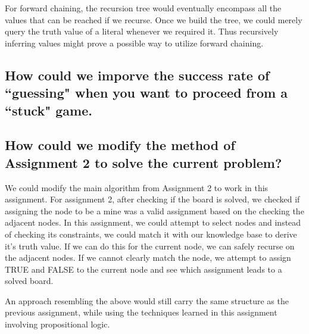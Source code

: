\documentclass{article}
\begin{document}
		For forward chaining, the recursion tree would eventually encompass all the 
		values that can be reached if we recurse. Once we build the tree, we could 
		merely query the truth value of a literal whenever we required it. Thus 
		recursively inferring values might prove a possible way to utilize forward 
		chaining.
	\subsection{How could we imporve the success rate of ``guessing" when you want to proceed from a
			``stuck" game.}
	\subsection{How could we modify the method of Assignment 2 to solve the current problem?}
		We could modify the main algorithm from Assignment 2 to work in this assignment. For assignment
		2, after checking if the board is solved, we checked if assigning the node to be a mine was a 
		valid assignment based on the checking the adjacent nodes. In this assignment, we could attempt
		to select nodes and instead of checking its constraints, we could match it with our knowledge base
		to derive it's truth value. If we can do this for the current node, we can safely recurse on the
		adjacent nodes. If we cannot clearly match the node, we attempt to assign TRUE and FALSE to the 
		current node and see which assignment leads to a solved board.

		An approach resembling the above would still carry the same structure as the previous assignment,
		while using the techniques learned in this assignment involving propositional logic.
\end{document}
